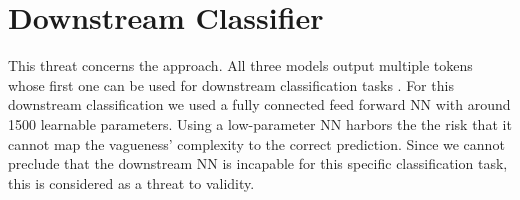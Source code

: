 \section{Downstream Classifier}
\label{chp:threats_to_validity:sec:downstream_classifier}

This threat concerns the approach.
All three models output multiple tokens whose first one can be used for downstream classification tasks \parencite{Devlin:2018}.
For this downstream classification we used a fully connected feed forward \ac{NN} with around 1500 learnable parameters.
Using a low-parameter \ac{NN} harbors the the risk that it cannot map the vagueness' complexity to the correct prediction.
Since we cannot preclude that the downstream \ac{NN} is incapable for this specific classification task, this is considered as a threat to validity.
